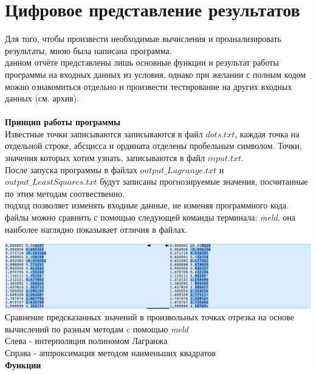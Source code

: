 \documentclass[a4paper, 14pt]{extreport}
\begin{document}
\section*{Цифровое представление результатов}
\;\;\;\;\;\;Для того, чтобы произвести необходимые вычисления и проанализировать результаты, мною была написана программа. \\ 
 данном отчёте представлены лишь основные функции и результат работы программы на входных данных из условия, однако при желании с полным кодом можно ознакомиться отдельно и произвести тестирование на других входных данных (см. архив).\\
\\
\indent\textbf{Принцип работы программы} \\
\indent Известные точки записываются записываются в файл $dots.txt$, каждая точка на отдельной строке, абсцисса и ордината отделены пробельным символом. Точки, значения которых хотим узнать, записываются в файл $input.txt$. \\ \indent После запуска программы в файлах $output\_Lagrange.txt$ и \\ $output\_LeastSquares.txt$ будут записаны прогнозируемые значения, посчитанные по этим методам соотвественно. \\
 подход позволяет изменять входные данные, не изменяя программного кода.
\\  файлы можно сравнить с помощью следующей команды терминала: \textit{meld}, она наиболее наглядно показывает отличия в файлах.

\noindent\includegraphics[width =\textwidth]{meld}
Сравнение предсказанных значений в произвольных точках отрезка на основе вычислений по разным методам c помощью \textit{meld}\\
Слева - интерполяция полиномом Лагранжа \\
Справа - аппроксимация методом наименьших квадратов \\

\indent \textbf{Функции}
\end{document}

